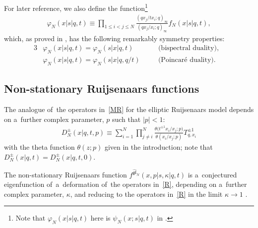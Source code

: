 \documentclass[pdftex]{sigma}%
\numberwithin{equation}{section}
\begin{document}
For later reference, we also define the function\footnote{Note that $\varphi_N(x|s|q,t)$ here is $\psi_N(x;s|q,t)$ in \cite{NS}.}
\begin{gather}
\label{phiN}
\varphi_N(x|s|q,t)\equiv \prod_{1\leq i<j\leq N} \frac{(qx_j/tx_i;q)_\infty}{(qx_j/x_i;q)_\infty} f_N(x|s|q,t),
\end{gather}
which, as proved in \cite{NS}, has the following remarkably symmetry properties:
\begin{alignat}{3}
&\varphi_N(x|s|q,t)= \varphi_N(s|x|q,t) \quad && \text{(bispectral duality)},& \nonumber\\
& \varphi_N(x|s|q,t)= \varphi_N(s|x|q,q/t) \quad && \text{(Poincar\'e duality)}.& \label{symmetry}
\end{alignat}

\subsection{Non-stationary Ruijsenaars functions}\label{sec:nonstat}

The analogue of~the operators in~\eqref{MR} for the elliptic Ruijsenaars model depends on a~further complex parameter, $p$ such that $|p|<1$:{\samepage
\begin{gather}\label{R}
D_N^\pm(x|q,t,p) \equiv \sum_{i=1}^N \prod_{j\neq i}^N \frac{\theta\big(t^{\pm 1}x_i/x_j;p\big)}{\theta(x_i/x_j;p)} T_{q,x_i}^{\pm 1}
\end{gather}
with the theta function $\theta(z;p)$ given in the introduction; note that $D_N^\pm(x|q,t)=D_N^\pm(x|q,t,0)$.}

The non-stationary Ruijsenaars function $f^{\widehat{\mathfrak{gl}}_N}(x,p|s,\kappa|q,t)$ is a~conjectured eigenfunction of~a~deformation of~the operators in~\eqref{R}, depending on a~further complex parameter, $\kappa$, and reducing to the operators in~\eqref{R} in the limit $\kappa\to 1$ \cite{S}.
\end{document}
